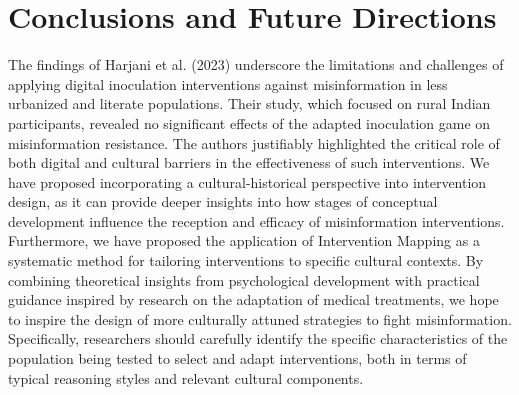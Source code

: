 \documentclass[authordate, reflection]{jote-new-article}
\begin{document}
	\section{Conclusions and Future Directions}



	The findings of Harjani et al. (2023) underscore the limitations and challenges of applying digital inoculation interventions against misinformation in less urbanized and literate populations. Their study, which focused on rural Indian participants, revealed no significant effects of the adapted inoculation game on misinformation resistance. The authors justifiably highlighted the critical role of both digital and cultural barriers in the effectiveness of such interventions. We have proposed incorporating a cultural-historical perspective into intervention design, as it can provide deeper insights into how stages of conceptual development influence the reception and efficacy of misinformation interventions. Furthermore, we have proposed the application of Intervention Mapping as a systematic method for tailoring interventions to specific cultural contexts. By combining theoretical insights from psychological development with practical guidance inspired by research on the adaptation of medical treatments, we hope to inspire the design of more culturally attuned strategies to fight misinformation. Specifically, researchers should carefully identify the specific characteristics of the population being tested to select and adapt interventions, both in terms of typical reasoning styles and relevant cultural components.
\end{document}
